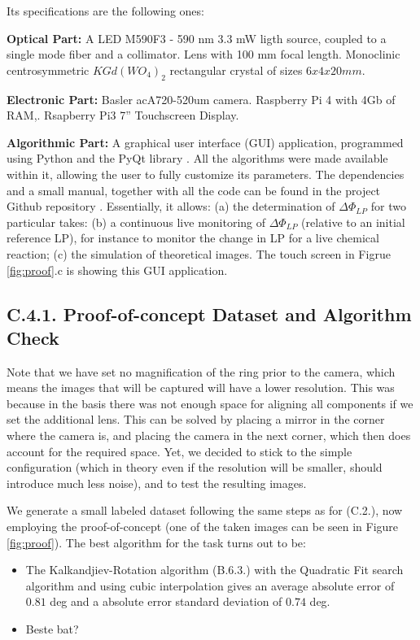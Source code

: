 \documentclass[11pt, a4paper, twoside]{article} %
\begin{document}
Its specifications are the following ones:

{\bf Optical Part:} A LED M590F3 - 590 nm 3.3 mW ligth source, coupled to a single mode fiber and a collimator. Lens with 100 mm focal length. Monoclinic centrosymmetric $KGd(WO_4)_2$ rectangular crystal of sizes $6x4x20mm$.

{\bf Electronic Part:} Basler acA720-520um camera. Raspberry Pi 4 with 4Gb of RAM,. Rsapberry Pi3 7'' Touchscreen Display.


{\bf Algorithmic Part:} A graphical user interface (GUI) application, programmed using Python and the PyQt library \cite{pyqt}. All the algorithms were made available within it, allowing the user to fully customize its parameters. The dependencies and a small manual, together with all the code can be found in the project Github repository \cite{github}. Essentially, it allows: (a) the determination of $\Delta \Phi_{LP}$ for two particular takes: (b) a continuous live monitoring of $\Delta\Phi_{LP}$ (relative to an initial reference LP), for instance to monitor the change in LP for a live chemical reaction; (c) the simulation of theoretical images. The touch screen in Figrue \ref{fig:proof}.c is showing this GUI application.



\subsection*{C.4.1. Proof-of-concept Dataset and Algorithm Check }

Note that we have set no magnification of the ring prior to the camera, which means the images that will be captured will have a lower resolution. This was because in the basis there was not enough space for aligning all components if we set the additional lens. This can be solved by placing a mirror in the corner where the camera is, and placing the camera in the next corner, which then does account for the required space. Yet, we decided to stick to the simple configuration (which in theory even if the resolution will be smaller, should introduce much less noise), and to test the resulting images.

We generate a small labeled dataset following the same steps as for (C.2.), now employing the proof-of-concept (one of the taken images can be seen in Figure \ref{fig:proof}). The best algorithm for the task turns out to be:
\begin{itemize}
\item The Kalkandjiev-Rotation algorithm (B.6.3.) with the Quadratic Fit search algorithm and using cubic interpolation gives an average absolute error of $0.81$ deg and a absolute error standard deviation of $0.74$ deg.
\item Beste bat?
\end{itemize}
\end{document}
